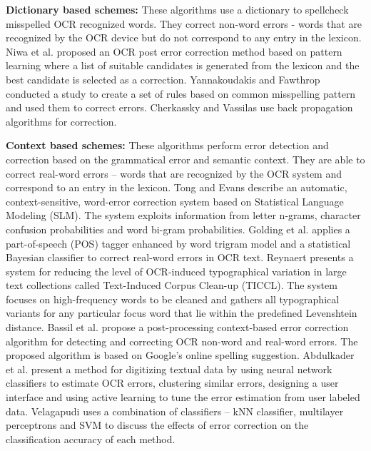 \documentclass[10pt, conference, compsocconf]{IEEEtran}
\begin{document}
\noindent \textbf{Dictionary based schemes: }These algorithms use a dictionary to spellcheck misspelled OCR recognized words. They correct non-word errors - words that are recognized by the OCR device but do not correspond to any entry in the lexicon. Niwa et al. \cite{postprocessing} proposed an OCR post error correction method based on pattern learning where a list of suitable candidates is generated from the lexicon and the best candidate is selected as a correction. Yannakoudakis and Fawthrop \cite{Yannakoudakis_83} conducted a study to create a set of rules based on common misspelling pattern and used them to correct errors. Cherkassky and Vassilas \cite{Cherkassky_89} use back propagation algorithms for correction. 

\noindent \textbf{Context based schemes: }These algorithms perform error detection and correction based on the grammatical error and semantic context. They are able to correct real-word errors -- words that are recognized by the OCR system and correspond to an entry in the lexicon. Tong and Evans \cite{Tong96astatistical} describe an automatic, context-sensitive, word-error correction system based on Statistical Language Modeling (SLM). The system exploits information from letter n-grams, character confusion probabilities and word bi-gram probabilities. Golding et al. \cite{contextbased} applies a part-of-speech (POS) tagger enhanced by word trigram model and a statistical Bayesian classifier to correct real-word errors in OCR text. Reynaert \cite{Reynaert2008a} presents a system for reducing the level of OCR-induced typographical variation in large text collections called Text-Induced Corpus Clean-up (TICCL). The system focuses on high-frequency words to be cleaned and gathers all typographical variants for any particular focus word that lie within the predefined Levenshtein distance. Bassil et al. \cite{Bassil_12a,Bassil_12b} propose a post-processing context-based error correction algorithm for detecting and correcting OCR non-word and real-word errors. The proposed algorithm is based on Google's online spelling suggestion. Abdulkader et al. \cite{lowcost}  present a method for digitizing textual data by using neural network classifiers to estimate OCR errors, clustering similar errors, designing a user interface and using active learning to tune the error estimation from user labeled data. 
Velagapudi \cite{velagapudi} uses a combination of classifiers -- kNN classifier,  multilayer perceptrons and SVM to discuss the effects of error correction on the classification accuracy of each method. 
\end{document}
